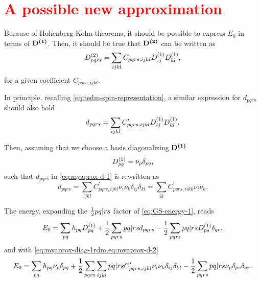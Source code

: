 \section{\textcolor{red}{A possible new approximation}} %
\label{sec:new-hypothesis}

Because of Hohenberg-Kohn theorems, it should be possible to express $E_0$ in
terms of $\boldsymbol{\mathrm{D^{\left( 1 \right)}}}$.
Then, it should be true that $\boldsymbol{\mathrm{D^{\left( 2 \right)}}}$ can be written as 
\begin{equation} \label{eq:myaprox-2rdm-1}
    D^{\left( 2 \right)}_{pqrs} = 
    \sum_{ijkl} C_{pqrs,ijkl} D^{\left( 1 \right)}_{ij} D^{\left( 1 \right)}_{kl}
    ,
\end{equation}
for a given coefficient $C_{pqrs,ijkl}$.

In principle, recalling \cref{eq:tedm-spin-representation}, a similar expression
for $d_{pqrs}$ should also hold
\begin{equation} \label{eq:myaprox-d-1}
    d_{pqrs} = 
    \sum_{ijkl} C_{pqrs,ijkl}^{\prime} D^{\left( 1 \right)}_{ij} D^{\left( 1 \right)}_{kl}
    .
\end{equation}

Then, assuming that we choose a basis diagonalizing $\boldsymbol{\mathrm{D^{\left( 1 \right)}}}$ 
\begin{equation} \label{eq:myaprox-diag-1rdm}
    D^{\left( 1 \right)}_{pq} = \nu_p \delta_{pq}
    ,
\end{equation}
such that $d_{pqrs}$ in \cref{eq:myaprox-d-1} is rewritten as
\begin{equation} \label{eq:myaprox-d-2}
    d_{pqrs} = 
    \sum_{ijkl} C_{pqrs,ijkl}^{\prime} \nu_i \nu_k \delta_{ij} \delta_{kl}
    =
    \sum_{ik} C_{pqrs,iikk}^{\prime} \nu_i \nu_k
    .
\end{equation}

The energy, expanding the $\frac{1}{2} \PBraket{pq | rs}$ factor of
\cref{eq:GS-energy-1}, reads
\begin{equation}
    E_0 =
    \sum_{pq} h_{pq} \oedm_{pq} +
    \frac{1}{2} \sum_{pqrs} \PBraket{pq | rs} d_{pqrs}
    - 
    \frac{1}{2} \sum_{pqrs} \PBraket{pq | rs} \oedm_{ps} \delta_{qr}
    ,
\end{equation}
and with \cref{eq:myaprox-diag-1rdm,eq:myaprox-d-2}
\begin{equation}
    E_0 =
    \sum_{pq} h_{pq} \nu_p \delta_{pq} +
    \frac{1}{2} \sum_{pqrs} \sum_{ijkl} \PBraket{pq | rs}
    C_{pqrs,ijkl}^{\prime} \nu_i \nu_k \delta_{ij} \delta_{kl}
    - 
    \frac{1}{2} \sum_{pqrs} \PBraket{pq | rs} \nu_p \delta_{ps} \delta_{qr}
    .
\end{equation}

